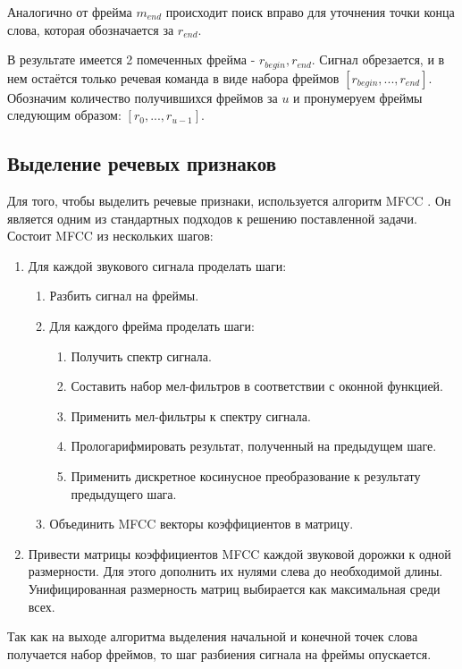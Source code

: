 Аналогично от фрейма $m_{end}$ происходит поиск вправо для уточнения точки конца слова, которая обозначается за $r_{end}$.

В результате имеется 2 помеченных фрейма - $r_{begin}, r_{end}$. Сигнал обрезается, и в нем остаётся только речевая команда в виде набора фреймов $[r_{begin}, ... , r_{end}]$. Обозначим количество получившихся фреймов за $u$ и пронумеруем фреймы следующим образом: $[r_0, ... , r_{u-1}]$.

\subsection{Выделение речевых признаков}
Для того, чтобы выделить речевые признаки, используется алгоритм MFCC \cite{MFCC}. Он является одним из стандартных подходов к решению поставленной задачи. Состоит MFCC из нескольких шагов:
\begin{enumerate}
	\item Для каждой звукового сигнала проделать шаги:
	\begin{enumerate}
		\item Разбить сигнал на фреймы.
		\item Для каждого фрейма проделать шаги:
		\begin{enumerate}
			\item Получить спектр сигнала.
			\item Составить набор мел-фильтров в соответствии с оконной функцией.
			\item Применить мел-фильтры к спектру сигнала.
			\item Прологарифмировать результат, полученный на предыдущем шаге.
			\item Применить дискретное косинусное преобразование к результату предыдущего шага.
		\end{enumerate}
		\item Объединить MFCC векторы коэффициентов в матрицу.
	\end{enumerate}

	\item Привести матрицы коэффициентов MFCC каждой звуковой дорожки к одной размерности. Для этого дополнить их нулями слева до необходимой длины. Унифицированная размерность матриц выбирается как максимальная среди всех.
\end{enumerate}
  
Так как на выходе алгоритма выделения начальной и конечной точек слова получается набор фреймов, то шаг разбиения сигнала на фреймы опускается.


